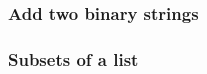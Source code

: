 \documentclass[10pt,a4paper]{article}
\begin{document}
\subsubsection*{Add two binary strings}

\subsubsection*{Subsets of a list}

% 
% 
\end{document}
